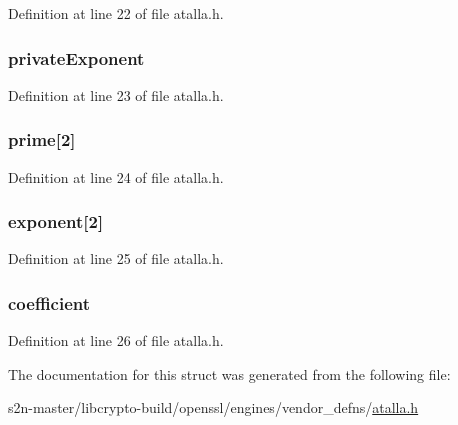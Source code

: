 Definition at line 22 of file atalla.\+h.

\subsubsection[{\texorpdfstring{private\+Exponent}{privateExponent}}]{ private\+Exponent}\hypertarget{struct_r_s_a_private_key_str_a490e24a12dabb408ef1780f2ef87c176}{}\label{struct_r_s_a_private_key_str_a490e24a12dabb408ef1780f2ef87c176}


Definition at line 23 of file atalla.\+h.

\subsubsection[{\texorpdfstring{prime}{prime}}]{ prime\mbox{[}2\mbox{]}}\hypertarget{struct_r_s_a_private_key_str_a31644a784403963a237eeb8c2f779f68}{}\label{struct_r_s_a_private_key_str_a31644a784403963a237eeb8c2f779f68}


Definition at line 24 of file atalla.\+h.

\subsubsection[{\texorpdfstring{exponent}{exponent}}]{ exponent\mbox{[}2\mbox{]}}\hypertarget{struct_r_s_a_private_key_str_a4966db388f6458949169ab6c46242e8e}{}\label{struct_r_s_a_private_key_str_a4966db388f6458949169ab6c46242e8e}


Definition at line 25 of file atalla.\+h.

\subsubsection[{\texorpdfstring{coefficient}{coefficient}}]{ coefficient}\hypertarget{struct_r_s_a_private_key_str_a8b1392de37feffb8710189ba894eb587}{}\label{struct_r_s_a_private_key_str_a8b1392de37feffb8710189ba894eb587}


Definition at line 26 of file atalla.\+h.



The documentation for this struct was generated from the following file\+:\begin{DoxyCompactItemize}
\item 
s2n-\/master/libcrypto-\/build/openssl/engines/vendor\+\_\+defns/\hyperlink{atalla_8h}{atalla.\+h}\end{DoxyCompactItemize}
